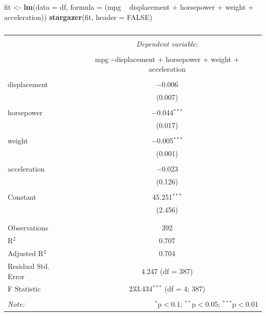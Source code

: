 \documentclass[]{article}
\newenvironment{Shaded}{\begin{snugshade}}{\end{snugshade}}
\newcommand{\KeywordTok}[1]{\textcolor[rgb]{0.13,0.29,0.53}{\textbf{{#1}}}}
\newcommand{\DataTypeTok}[1]{\textcolor[rgb]{0.13,0.29,0.53}{{#1}}}
\newcommand{\StringTok}[1]{\textcolor[rgb]{0.31,0.60,0.02}{{#1}}}
\newcommand{\OtherTok}[1]{\textcolor[rgb]{0.56,0.35,0.01}{{#1}}}
\newcommand{\NormalTok}[1]{{#1}}
\begin{document}
\begin{Shaded}
\begin{Highlighting}[]
\NormalTok{fit <-}\StringTok{ }\KeywordTok{lm}\NormalTok{(}\DataTypeTok{data =} \NormalTok{df, }\DataTypeTok{formula =} \NormalTok{(mpg ~}\StringTok{ }\NormalTok{displacement +}\StringTok{  }\NormalTok{horsepower +}
\StringTok{                                  }\NormalTok{weight +}\StringTok{ }\NormalTok{acceleration))}
\KeywordTok{stargazer}\NormalTok{(fit, }\DataTypeTok{header =} \OtherTok{FALSE}\NormalTok{)}
\end{Highlighting}
\end{Shaded}

\begin{table}[!htbp] \centering 
  \caption{} 
  \label{} 
\begin{tabular}{@{\extracolsep{5pt}}lc} 
\\[-1.8ex]\hline 
\hline \\[-1.8ex] 
 & \multicolumn{1}{c}{\textit{Dependent variable:}} \\ 
\cline{2-2} 
\\[-1.8ex] & mpg \textasciitilde displacement + horsepower + weight + acceleration \\ 
\hline \\[-1.8ex] 
 displacement & $-$0.006 \\ 
  & (0.007) \\ 
  & \\ 
 horsepower & $-$0.044$^{***}$ \\ 
  & (0.017) \\ 
  & \\ 
 weight & $-$0.005$^{***}$ \\ 
  & (0.001) \\ 
  & \\ 
 acceleration & $-$0.023 \\ 
  & (0.126) \\ 
  & \\ 
 Constant & 45.251$^{***}$ \\ 
  & (2.456) \\ 
  & \\ 
\hline \\[-1.8ex] 
Observations & 392 \\ 
R$^{2}$ & 0.707 \\ 
Adjusted R$^{2}$ & 0.704 \\ 
Residual Std. Error & 4.247 (df = 387) \\ 
F Statistic & 233.434$^{***}$ (df = 4; 387) \\ 
\hline 
\hline \\[-1.8ex] 
\textit{Note:}  & \multicolumn{1}{r}{$^{*}$p$<$0.1; $^{**}$p$<$0.05; $^{***}$p$<$0.01} \\ 
\end{tabular} 
\end{table}
\end{document}
